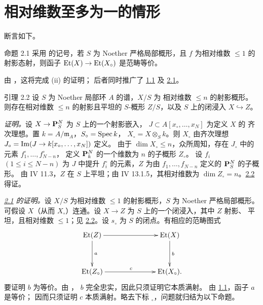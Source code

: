 \section{相对维数至多为一的情形}\pageoriginale

断言如下。

\begin{enonce*}{命题 2.1}
采用 \textup{} 的记号，若
$S$ 为 Noether 严格局部概形，且 $f$ 为相对维数
$\leq1$ 的射影态射，则函子
$\operatorname{Et}(X)\rightarrow\operatorname{Et}(X_{\circ})$ 是范畴等价。

由 \textup{}，这将完成
\textup{ (ii)} 的证明；
后者同时推广了 \hyperref[XIII.prop1.1]{1.1} 及
\hyperref[XIII.prop2.1]{2.1}。
\end{enonce*}

\begin{enonce*}{引理 2.2}
设 $S$ 为 Noether 局部环 $A$ 的谱，$X/S$ 为
相对维数 $\leq n$ 的射影概形。则存在相对维数
$\leq n$ 的射影且平坦的 $S$-概形 $Z/S$，以及
$S$ 上的闭浸入 $X\hookrightarrow Z$。
\end{enonce*}

\noindent
\emph{证明。}设 $X\rightarrow\mathbf{P}^N_S$ 为 $S$ 上的一个射影嵌入，
$J\subset A[x_{\circ},\ldots,x_N]$ 为定义 $X$ 的
齐次理想。置 $k=A/\mathfrak m_A$，$S_{\circ}=\operatorname{Spec} k$，
$X_{\circ}=X\otimes_Sk$。则 $X_{\circ}$ 由齐次理想
$J_{\circ}=\operatorname{Im}(J\rightarrow k[x_{\circ},\dots,x_N])$ 定义。
由于 $\dim X_{\circ}\leq n$，众所周知，存在
$J_{\circ}$ 中的元素 $f^{\circ}_1,\ldots,f^{\circ}_{N-n}$，
定义 $\mathbf{P}^N_k$ 的一个维数为 $n$ 的子概形 $Z_{\circ}$。
设 $f_i$ $(1\leq i\leq N-n)$ 为 $J$ 中提升
$f^{\circ}_i$ 的元素，$Z$ 为由
$f_1,\ldots,f_{N-n}$ 定义的 $\mathbf{P}^N_S$ 的子概形。
由 \EGA IV 11.3，$Z$ 在 $S$ 上平坦；由
\EGA IV 13.1.5，其相对维数为
$\dim Z_{\circ}=n$。\hyperref[XIII.lem2.2]{2.2} 得证。

\noindent
\emph{\hyperref[XIII.prop2.1]{2.1} 的证明。}设 $X/S$ 为相对维数
$\leq1$ 的射影概形，$S$ 为 Noether 严格局部概形。
可假设 $X$（从而 $X_{\circ}$）连通。设
$X\rightarrow Z$ 为 $S$ 上的一个闭浸入，其中 $Z$ 射影、
平坦，且相对维数 $\leq1$；见
\hyperref[XIII.lem2.2]{2.2}。设 $s_{\circ}$ 为
$S$ 的闭点。有相应的\pageoriginale 范畴图式
$$
\xymatrix@C=2.5cm@R=1.25cm{
\Et(Z)\ar[r]\ar[d]^{a}&\Et(X)\ar[d]^{b}\\
\Et(Z_{\circ})\ar[r]^{c}&\Et(X_{\circ}).
}
$$
要证明 $b$ 为等价。由 ，
$b$ 完全忠实，因此只须证明它本质满射。
由 \hyperref[XIII.prop1.1]{1.1}，函子 $a$ 是等价；
因而只须证明 $c$ 本质满射。略去下标
${}_{\circ}$，问题就归结为以下命题。

